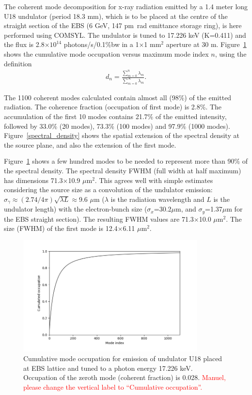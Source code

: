 \documentclass[%
 reprint,
 amsmath,amssymb,
 aps,
]{revtex4-1}
\begin{document}
The coherent mode decomposition for x-ray radiation emitted by a 1.4 meter long U18 undulator (period 18.3 mm), which is to be placed at the centre of the straight section of the EBS (6 GeV, 147 pm~rad emittance storage ring), is here performed using COMSYL. The undulator is tuned to 17.226 keV (K=0.411) and the flux is 2.8$\times 10^{14}$ photons/s/0.1\%bw in a 1$\times$1 mm$^2$ aperture at 30 m. Figure~\ref{cumulative_mode_occupation} shows the cumulative mode occupation versus maximum mode index $n$, using the definition
\begin{equation}
\begin{aligned}
\label{spectrum}
d_n=\frac{\sum_{m=0}^{n} \lambda_m}{\sum_{m=0}^{\infty} \lambda_m}.
\end{aligned}
\end{equation}

The 1100 coherent modes calculated contain almost all (98\%) of the emitted radiation. The coherence fraction (occupation of first mode) is 2.8\%. The accumulation of the first 10 modes contains 21.7\% of the emitted intensity, followed by 33.0\% (20 modes), 73.3\% (100 modes) and 97.9\% (1000 modes). 
Figure~\ref{spectral_density} shows the spatial extension of the spectral density at the source plane, and also the extension of the first mode.

Figure~\ref{cumulative_mode_occupation} shows a few hundred modes to be needed to represent more than 90\% of the spectral density. The spectral density FWHM (full width at half maximum) has dimensions 71.3$\times$10.9 $\mu$m$^2$. This agrees well with simple estimates considering the source size as a convolution of the undulator emission: $\sigma_\gamma\approx (2.74/4\pi) \sqrt{\lambda L}\approx$9.6 $\mu$m ($\lambda$ is the radiation wavelength and $L$ is the undulator length) with the electron-bunch size ($\sigma_x$=30.2$\mu$m, and $\sigma_y$=1.37$\mu$m for the EBS straight section). The resulting FWHM values are 71.3$\times$10.0 $\mu$m$^2$. The size (FWHM) of the first mode is 12.4$\times$6.11 $\mu$m$^2$.  

\begin{figure}
\includegraphics[trim=15mm 5mm 0 0,clip,width=9.5cm]{Figures/vx_cumulated.png}
\caption{Cumulative mode occupation for  emission of undulator U18 placed at EBS lattice and tuned to a photon energy 17.226 keV. Occupation of the zeroth mode (coherent fraction) is 0.028. \textcolor{red}{Manuel, please change the vertical label to ``Cumulative occupation''.}}
\label{cumulative_mode_occupation}
\end{figure}
\end{document}

